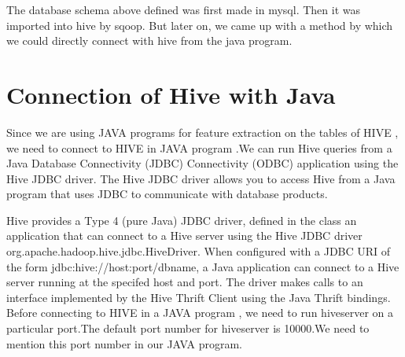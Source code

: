 \documentclass[a4paper,12pt,oneside]{sphinxmanual}
\begin{document}
The database schema above defined was first made in mysql. Then it was imported into hive by sqoop. But later on, we came up with a method by which we could directly connect with hive from the java program.


\chapter{Connection of Hive with Java}
\label{document:connection-of-hive-with-java}
\begin{DUlineblock}{0em}
\item[] Since we are using JAVA programs for feature extraction on the tables of HIVE , we need to connect to HIVE in JAVA program .We can run Hive queries from a Java Database Connectivity (JDBC)  Connectivity (ODBC) application using  the Hive JDBC  driver. The Hive JDBC driver allows you to access Hive from a Java program  that uses JDBC to communicate with database products.
\end{DUlineblock}

\begin{DUlineblock}{0em}
\item[] Hive provides a Type 4 (pure Java) JDBC driver, defined in the class an application that can connect to a Hive server using the Hive JDBC driver  org.apache.hadoop.hive.jdbc.HiveDriver. When configured with a JDBC URI of the form jdbc:hive://host:port/dbname, a Java application can connect to a Hive server running at the specifed host and port. The driver makes calls to an interface implemented by the Hive Thrift Client using the Java Thrift bindings. Before connecting to HIVE in a JAVA program , we need to run hiveserver on a particular port.The default port number for hiveserver is 10000.We need to mention this port number in our JAVA program.
\end{DUlineblock}
\begin{figure}[htbp]
\centering

\end{figure}
\end{document}
